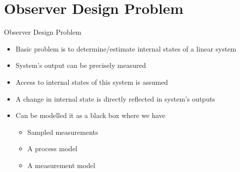 \documentclass{beamer}
\begin{document}
\section{Observer Design Problem}
\begin{frame}{Observer Design Problem}

\begin{itemize}
  \item Basic problem is to determine/estimate internal states of a linear system
  \item System's output can be precisely measured
  \item Access to internal states of this system is assumed
  \item A change in internal state is directly reflected in system's outputs
  \item Can be modelled it as a black box where we have
  \begin{itemize}
    \item Sampled measurements
    \item A process model
    \item A measurement model
  \end{itemize}
\end{itemize}
\vskip 1cm
\end{frame}
\end{document}
